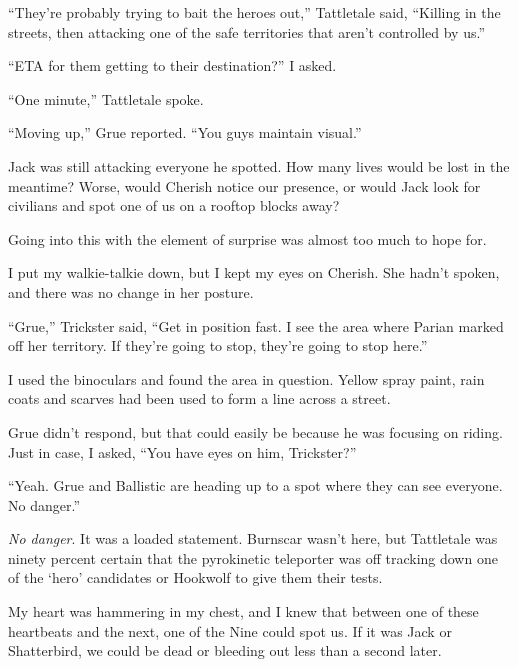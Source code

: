 ``They're probably trying to bait the heroes out,'' Tattletale said, ``Killing in the streets, then attacking one of the safe territories that aren't controlled by us.''



``ETA for them getting to their destination?'' I asked.



``One minute,'' Tattletale spoke.



``Moving up,'' Grue reported.  ``You guys maintain visual.''



Jack was still attacking everyone he spotted.  How many lives would be lost in the meantime?  Worse, would Cherish notice our presence, or would Jack look for civilians and spot one of us on a rooftop blocks away?



Going into this with the element of surprise was almost too much to hope for.



I put my walkie-talkie down, but I kept my eyes on Cherish.  She hadn't spoken, and there was no change in her posture.



``Grue,'' Trickster said, ``Get in position fast.  I see the area where Parian marked off her territory.  If they're going to stop, they're going to stop here.''



I used the binoculars and found the area in question.  Yellow spray paint, rain coats and scarves had been used to form a line across a street.



Grue didn't respond, but that could easily be because he was focusing on riding.  Just in case, I asked, ``You have eyes on him, Trickster?''



``Yeah.  Grue and Ballistic are heading up to a spot where they can see everyone.  No danger.''



\emph{No danger}.  It was a loaded statement.  Burnscar wasn't here, but Tattletale was ninety percent certain that the pyrokinetic teleporter was off tracking down one of the `hero' candidates or Hookwolf to give them their tests.



My heart was hammering in my chest, and I knew that between one of these heartbeats and the next, one of the Nine could spot us.  If it was Jack or Shatterbird, we could be dead or bleeding out less than a second later.



